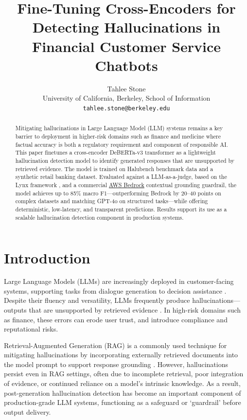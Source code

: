 \documentclass[11pt]{article}
\title{Fine-Tuning Cross-Encoders for Detecting Hallucinations in Financial Customer Service Chatbots}
\author{
  Tahlee Stone \\
  University of California, Berkeley, School of Information \\
  \texttt{tahlee.stone@berkeley.edu}
}
\begin{document}
\maketitle

\begin{abstract}
Mitigating hallucinations in Large Language Model (LLM) systems remains a key barrier to deployment in higher-risk domains such as finance and medicine where factual accuracy is both a regulatory requirement and component of responsible AI. 
This paper finetunes a cross-encoder DeBERTa-v3 transformer as a lightweight hallucination detection model to identify generated responses that are unsupported by retrieved evidence. The model is trained on Halubench benchmark data and a synthetic retail banking dataset. Evaluated against a LLM-as-a-judge, based on the Lynx framework \citet{ravi2024lynx}, and a commercial \href{https://docs.aws.amazon.com/bedrock/latest/userguide/guardrails-contextual-grounding-check.html}{AWS Bedrock} contextual grounding guardrail, the model achieves up to 85\% macro F1—outperforming Bedrock by 20–40 points on complex datasets and matching GPT-4o on structured tasks—while offering deterministic, low-latency, and transparent predictions. Results support its use as a scalable hallucination detection component in production systems.
\end{abstract}

\section{Introduction}

Large Language Models (LLMs) are increasingly deployed in customer-facing systems, supporting tasks from dialogue generation to decision assistance \citep{brown2020language, openai2023gpt4}. Despite their fluency and versatility, LLMs frequently produce hallucinations—outputs that are unsupported by retrieved evidence \citep{ji2023survey}. In high-risk domains such as finance, these errors can erode user trust, and introduce compliance and reputational risks.

Retrieval-Augmented Generation (RAG) is a commonly used technique for mitigating hallucinations by incorporating externally retrieved documents into the model prompt to support response grounding \citep{lewis2020retrieval}. However, hallucinations persist even in RAG settings, often due to incomplete retrieval, poor integration of evidence, or continued reliance on a model’s intrinsic knowledge. As a result, post-generation hallucination detection has become an important component of production-grade LLM systems, functioning as a safeguard or `guardrail' before output delivery.
\end{document}
